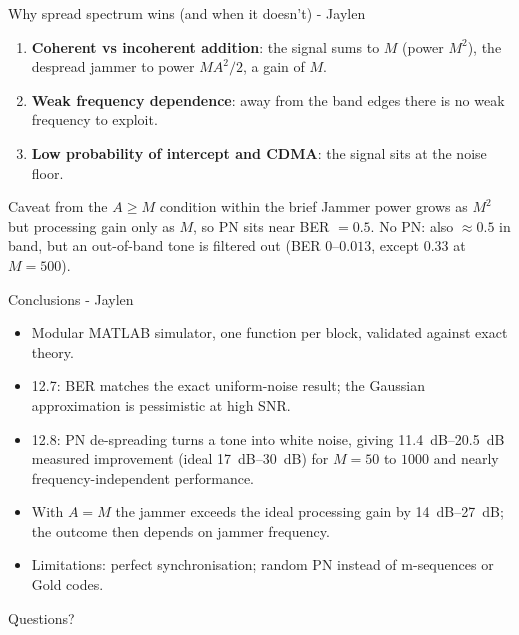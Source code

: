 \documentclass[aspectratio=169,11pt]{beamer}
\begin{document}
\begin{frame}{Why spread spectrum wins (and when it doesn't) - Jaylen}
\begin{enumerate}
  \item \textbf{Coherent vs incoherent addition}: the signal sums to $M$ (power $M^2$),
        the despread jammer to power $MA^2/2$, a gain of $M$.
  \item \textbf{Weak frequency dependence}: away from the band edges there is no weak frequency to exploit.
  \item \textbf{Low probability of intercept and CDMA}: the signal sits at the noise floor.
\end{enumerate}
\vspace{0.3cm}
\begin{alertblock}{Caveat from the $A\ge M$ condition within the brief}
Jammer power grows as $M^2$ but processing gain only as $M$, so PN sits near BER $=0.5$.
No PN: also $\approx0.5$ in band, but an out-of-band tone is filtered out (BER $0$--$0.013$, except $0.33$ at $M=500$).
\end{alertblock}
\end{frame}

\begin{frame}{Conclusions - Jaylen}
\begin{itemize}
  \item Modular MATLAB simulator, one function per block, validated against exact theory.
  \item 12.7: BER matches the exact uniform-noise result; the Gaussian
        approximation is pessimistic at high SNR.
  \item 12.8: PN de-spreading turns a tone into white noise, giving
        \SIrange{11.4}{20.5}{dB} measured improvement (ideal \SIrange{17}{30}{dB}) for $M=50$ to $1000$ and
        nearly frequency-independent performance.
  \item With $A=M$ the jammer exceeds the ideal processing gain by \SIrange{14}{27}{dB}; the outcome then depends on jammer frequency.
  \item Limitations: perfect synchronisation; random PN instead of m-sequences or Gold codes.
\end{itemize}
\end{frame}

\begin{frame}[standout]
Questions?
\end{frame}
\end{document}

